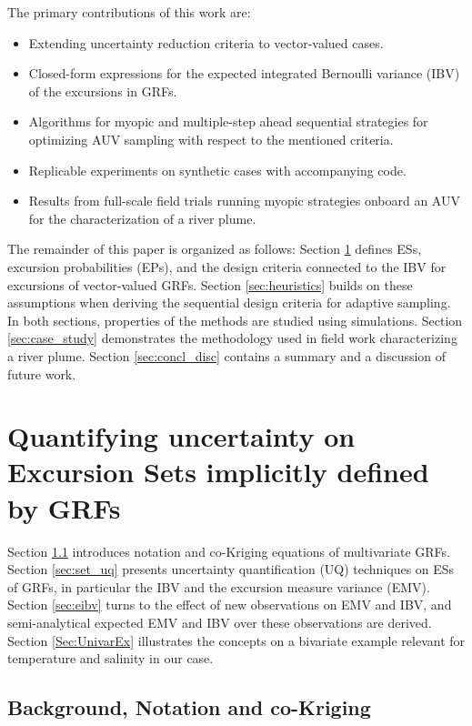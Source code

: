 \documentclass[aoas]{imsart}
\begin{document}
The primary contributions of this work are:

\begin{itemize}
\item Extending uncertainty reduction criteria to
  vector-valued cases.  
\item Closed-form expressions for the expected integrated Bernoulli
  variance (IBV) of the excursions in GRFs. 
\item Algorithms for myopic and multiple-step ahead sequential
  strategies for optimizing AUV sampling with respect to the mentioned
  criteria. 
\item Replicable experiments on synthetic cases with accompanying
  code.
\item Results from full-scale field trials running myopic strategies onboard an AUV for the characterization of a river plume. 
\end{itemize}

The remainder of this paper is organized as follows:
Section \ref{sec:ESEP} defines ESs, excursion probabilities (EPs), and
the design criteria connected to the IBV for excursions of
vector-valued GRFs. Section \ref{sec:heuristics} builds on these
assumptions when deriving the sequential design criteria for adaptive
sampling. In both sections, properties of the methods are studied using
simulations. Section \ref{sec:case_study} demonstrates the methodology
used in field work characterizing a river plume. Section
\ref{sec:concl_disc} contains a summary and a discussion of future
work.


\section{Quantifying uncertainty on Excursion Sets implicitly defined by GRFs}
\label{sec:ESEP}

Section \ref{sec:bg_and_notation} introduces notation and co-Kriging
equations of multivariate GRFs.  Section \ref{sec:set_uq} presents
uncertainty quantification (UQ) techniques on ESs of GRFs, in
particular the IBV and the excursion measure variance (EMV).  Section
\ref{sec:eibv} turns to the effect of new observations on EMV and IBV,
and semi-analytical expected EMV and IBV over these observations are
derived.
Section \ref{Sec:UnivarEx} illustrates the concepts on a bivariate
example relevant for temperature and salinity in our case.

\subsection{Background, Notation and co-Kriging}
\label{sec:bg_and_notation}
\end{document}
